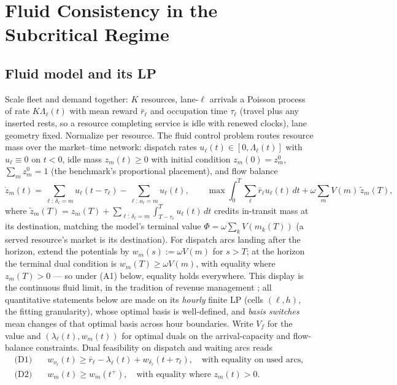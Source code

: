 \documentclass[11pt]{article}
\begin{document}
\section{Fluid Consistency in the Subcritical Regime}
\label{sec:fluid}

\subsection{Fluid model and its LP}

Scale fleet and demand together: $K$ resources, lane-$\ell$ arrivals a
Poisson process of rate $K \Lambda_{\ell}(t)$ with mean reward
$\bar{r}_{\ell}$ and occupation time $\tau_{\ell}$ (travel plus any
inserted rests, so a resource completing service is idle with renewed
clocks), lane geometry fixed.
Normalize per resource. The fluid control problem routes resource mass
over the market--time network: dispatch rates
$u_{\ell}(t) \in [0, \Lambda_{\ell}(t)]$ with $u_{\ell} \equiv 0$ on
$t < 0$, idle mass $z_m(t) \geq 0$ with initial condition
$z_m(0) = z^0_m$, $\sum_m z^0_m = 1$ (the benchmark's proportional
placement), and flow balance
\begin{equation}
  \dot{z}_m(t) = \sum_{\ell:\, \delta_{\ell} = m} u_{\ell}(t - \tau_{\ell})
  - \sum_{\ell:\, o_{\ell} = m} u_{\ell}(t), \qquad
  \max \int_0^T \sum_{\ell} \bar{r}_{\ell} u_{\ell}(t)\, dt
  + \omega \sum_m V(m)\, \tilde{z}_m(T),
  \label{eq:fluid}
\end{equation}
where $\tilde{z}_m(T) = z_m(T) + \sum_{\ell:\, \delta_{\ell} = m}
\int_{T - \tau_{\ell}}^{T} u_{\ell}(t)\, dt$ credits in-transit mass at
its destination, matching the model's terminal value
$\Phi = \omega \sum_k V(m_k(T))$ (a served resource's market is its
destination). For dispatch arcs landing after the horizon, extend the
potentials by $w_m(s) := \omega V(m)$ for $s > T$; at the horizon the
terminal dual condition is $w_m(T) \geq \omega V(m)$, with equality
where $z_m(T) > 0$ --- so under (A1) below, equality holds everywhere.
This display is the continuous fluid limit, in the tradition of
revenue management \citep{gallego1997network}; all quantitative
statements below are made on its \emph{hourly} finite LP (cells
$(\ell, h)$, the fitting granularity), whose optimal basis is
well-defined, and \emph{basis switches} mean changes of that optimal
basis across hour boundaries. Write $V_f$ for the value and
$(\lambda_{\ell}(t), w_m(t))$ for optimal duals on the arrival-capacity
and flow-balance constraints. Dual feasibility on dispatch and waiting
arcs reads
\begin{align}
  \text{(D1)}\quad & w_{o_{\ell}}(t) \geq \bar{r}_{\ell}
  - \lambda_{\ell}(t) + w_{\delta_{\ell}}(t + \tau_{\ell}),
  \quad \text{with equality on used arcs}, \nonumber \\
  \text{(D2)}\quad & w_m(t) \geq w_m(t^{+}),
  \quad \text{with equality where } z_m(t) > 0. \nonumber
\end{align}
\end{document}
